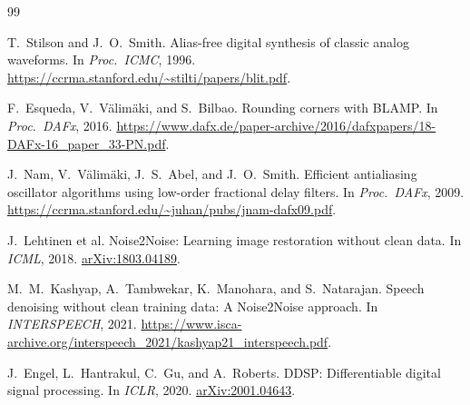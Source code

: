 \documentclass[10pt,twocolumn,letterpaper]{article}
\theoremstyle{remark}
\begin{document}













\appendix



\FloatBarrier
\raggedbottom
\balance
{\footnotesize
\setlength{\baselineskip}{11.5pt}
\begin{thebibliography}{99}
\setlength{\itemsep}{0.25ex plus 0.05ex}
\setlength{\parsep}{0pt}
\setlength{\parskip}{0pt}

T.~Stilson and J.~O.~Smith.
\newblock Alias-free digital synthesis of classic analog waveforms.
\newblock In \emph{Proc.\ ICMC}, 1996.
\newblock \url{https://ccrma.stanford.edu/~stilti/papers/blit.pdf}.

F.~Esqueda, V.~V\"alim\"aki, and S.~Bilbao.
\newblock Rounding corners with BLAMP.
\newblock In \emph{Proc.\ DAFx}, 2016.
\newblock \url{https://www.dafx.de/paper-archive/2016/dafxpapers/18-DAFx-16_paper_33-PN.pdf}.

J.~Nam, V.~V\"alim\"aki, J.~S.~Abel, and J.~O.~Smith.
\newblock Efficient antialiasing oscillator algorithms using low-order fractional delay filters.
\newblock In \emph{Proc.\ DAFx}, 2009.
\newblock \url{https://ccrma.stanford.edu/~juhan/pubs/jnam-dafx09.pdf}.

J.~Lehtinen et al.
\newblock Noise2Noise: Learning image restoration without clean data.
\newblock In \emph{ICML}, 2018.
\newblock \href{https://arxiv.org/abs/1803.04189}{arXiv:1803.04189}.

M.~M.~Kashyap, A.~Tambwekar, K.~Manohara, and S.~Natarajan.
\newblock Speech denoising without clean training data: A Noise2Noise approach.
\newblock In \emph{INTERSPEECH}, 2021.
\newblock \url{https://www.isca-archive.org/interspeech_2021/kashyap21_interspeech.pdf}.

J.~Engel, L.~Hantrakul, C.~Gu, and A.~Roberts.
\newblock DDSP: Differentiable digital signal processing.
\newblock In \emph{ICLR}, 2020.
\newblock \href{https://arxiv.org/abs/2001.04643}{arXiv:2001.04643}.


\end{thebibliography}}
\end{document}
